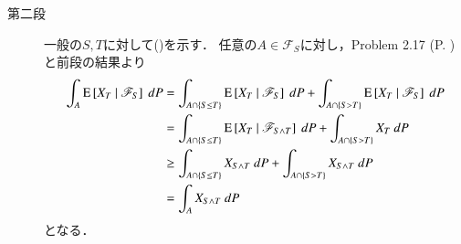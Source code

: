 \begin{prf}
\begin{description}
			\item[第二段]
				一般の$S,T$に対して()を示す．
				任意の$A \in \mathscr{F}_S$に対し，Problem 2.17 (P. \pageref{chapter_1_Problem_2_17})
				と前段の結果より
				\begin{align}
					\int_A \cexp{X_T}{\mathscr{F}_S}\ dP
					&= \int_{A \cap \{S \leq T\}} \cexp{X_T}{\mathscr{F}_S}\ dP
						+ \int_{A \cap \{S > T\}} \cexp{X_T}{\mathscr{F}_S}\ dP \\
					&= \int_{A \cap \{S \leq T\}} \cexp{X_T}{\mathscr{F}_{S \wedge T}}\ dP
						+ \int_{A \cap \{S > T\}} X_T\ dP \\
					&\geq \int_{A \cap \{S \leq T\}} X_{S \wedge T}\ dP
					 	+ \int_{A \cap \{S > T\}} X_{S \wedge T}\ dP \\
					&= \int_A X_{S \wedge T}\ dP
				\end{align}
				となる．
		\end{description}
	\end{prf}